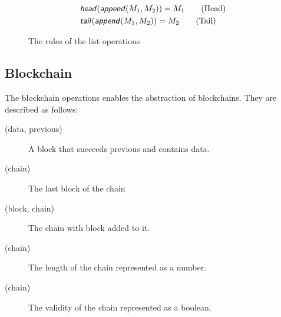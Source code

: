 \begin{figure}[h]
	\begin{align*}
		&\text{\sffamily \textit{head}\normalfont}(\text{\sffamily \textit{append}\normalfont}(M_1, M_2)) = M_1 \tag{Head} \\
		&\text{\sffamily \textit{tail}\normalfont}(\text{\sffamily \textit{append}\normalfont}(M_1, M_2)) = M_2 \tag{Tail}
	\end{align*}
	\caption{The rules of the list operations}
	\label{listoprules}
\end{figure}
\FloatBarrier

\subsection{Blockchain}

The blockchain operations enables the abstraction of blockchains.
They are described as follows:

\begin{description}
	\item[(data, previous)]
	A block that succeeds previous and contains data.
	\item[(chain)]
	The last block of the chain
	\item[(block, chain)]
	The chain with block added to it.
	\item[(chain)]
	The length of the chain represented as a number.
	\item[(chain)]
	The validity of the chain represented as a boolean.
\end{description}
